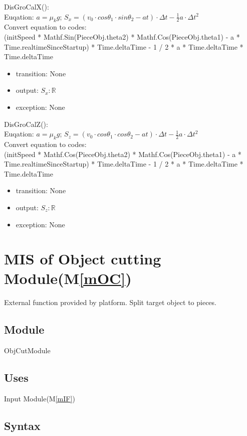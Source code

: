 \documentclass[12pt, titlepage]{article}
\newcommand{\mref}[1]{M\ref{#1}}
\begin{document}
\noindent DisGroCalX():\\
Euqation: $a=\mu_{k}g$; $S_{x}=(v_{0}\cdot cos\theta _{1}\cdot sin\theta _{2} - at)\cdot \Delta t-\frac{1}{2}a \cdot \Delta t^{2}$\\
Convert equation to codes:\\
(initSpeed * Mathf.Sin(PieceObj.theta2) * Mathf.Cos(PieceObj.theta1) - a * Time.realtimeSinceStartup) * Time.deltaTime - 1 / 2 * a * Time.deltaTime * Time.deltaTime
\begin{itemize}
	\item transition: None
	\item output: $S_{x}: \mathbb{R}$ 
	\item exception: None 
\end{itemize}

\noindent DisGroCalZ():\\
Euqation: $a=\mu_{k}g$; $S_{z}=(v_{0}\cdot cos\theta _{1}\cdot cos\theta _{2} - at)\cdot \Delta t-\frac{1}{2}a \cdot \Delta t^{2}$\\
Convert equation to codes:\\
(initSpeed * Mathf.Cos(PieceObj.theta2) * Mathf.Cos(PieceObj.theta1) - a * Time.realtimeSinceStartup) * Time.deltaTime - 1 / 2 * a * Time.deltaTime * Time.deltaTime
\begin{itemize}
	\item transition: None
	\item output: $S_{z}: \mathbb{R}$ 
	\item exception: None 
\end{itemize}

\section{MIS of Object cutting Module(\mref{mOC})}

External function provided by platform. Split target object to pieces.

\subsection{Module}

ObjCutModule

\subsection{Uses}

Input Module(\mref{mIF})

\subsection{Syntax}
\end{document}
